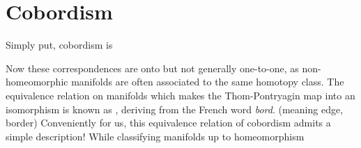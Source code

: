 \chapter{Cobordism}

Simply put, cobordism is 


Now these correspondences are onto but not generally one-to-one, as non-homeomorphic manifolds are often associated to the same homotopy class. The equivalence relation on manifolds which makes the Thom-Pontryagin map into an isomorphism is known as , deriving from the French word \emph{bord}. (meaning edge, border) Conveniently for us, this equivalence relation of cobordism admits a simple description! While classifying manifolds up to homeomorphism 


